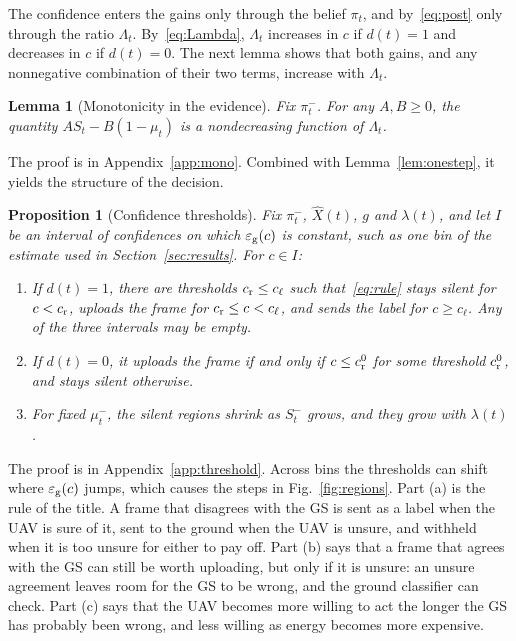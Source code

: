 \documentclass[journal]{IEEEtran}
\newtheorem{lemma}{Lemma}
\newtheorem{proposition}{Proposition}
\theoremstyle{remark}
\newcommand{\lab}{\ell}
\newcommand{\ee}{\varepsilon}
\begin{document}
The confidence enters the gains only through the belief $\pi_t$, and by~\eqref{eq:post} only through the ratio $\Lambda_t$. By~\eqref{eq:Lambda}, $\Lambda_t$ increases in $c$ if $d(t)=1$ and decreases in $c$ if $d(t)=0$. The next lemma shows that both gains, and any nonnegative combination of their two terms, increase with $\Lambda_t$.

\begin{lemma}[Monotonicity in the evidence]\label{lem:mono}
Fix $\pi^-_t$. For any $A,B\ge0$, the quantity $AS_t-B(1-\mu_t)$ is a nondecreasing function of $\Lambda_t$.
\end{lemma}

The proof is in Appendix~\ref{app:mono}. Combined with Lemma~\ref{lem:onestep}, it yields the structure of the decision.

\begin{proposition}[Confidence thresholds]\label{prop:threshold}
Fix $\pi^-_t$, $\hat X(t)$, $g$ and $\lambda(t)$, and let $I$ be an interval of confidences on which $\ee_{\rm g}(c)$ is constant, such as one bin of the estimate used in Section~\ref{sec:results}. For $c\in I$:
\begin{enumerate}
\item[(a)] If $d(t)=1$, there are thresholds $c_{\rm r}\le c_{\lab}$ such that~\eqref{eq:rule} stays silent for $c<c_{\rm r}$, uploads the frame for $c_{\rm r}\le c<c_{\lab}$, and sends the label for $c\ge c_{\lab}$. Any of the three intervals may be empty.
\item[(b)] If $d(t)=0$, it uploads the frame if and only if $c\le c^0_{\rm r}$ for some threshold $c^0_{\rm r}$, and stays silent otherwise.
\item[(c)] For fixed $\mu^-_t$, the silent regions shrink as $S^-_t$ grows, and they grow with $\lambda(t)$.
\end{enumerate}
\end{proposition}

The proof is in Appendix~\ref{app:threshold}. Across bins the thresholds can shift where $\ee_{\rm g}(c)$ jumps, which causes the steps in Fig.~\ref{fig:regions}. Part (a) is the rule of the title. A frame that disagrees with the GS is sent as a label when the UAV is sure of it, sent to the ground when the UAV is unsure, and withheld when it is too unsure for either to pay off. Part (b) says that a frame that agrees with the GS can still be worth uploading, but only if it is unsure: an unsure agreement leaves room for the GS to be wrong, and the ground classifier can check. Part (c) says that the UAV becomes more willing to act the longer the GS has probably been wrong, and less willing as energy becomes more expensive.
\end{document}
